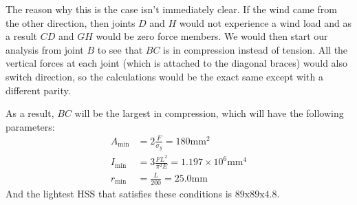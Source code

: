 \documentclass{article}
\begin{document}
The reason why this is the case isn't immediately clear. If the wind came from the other direction, then joints $D$ and $H$ would not experience a wind load and as a result $CD$ and $GH$ would be zero force members. We would then start our analysis from joint $B$ to see that $BC$ is in compression instead of tension. All the vertical forces at each joint (which is attached to the diagonal braces) would also switch direction, so the calculations would be the exact same except with a different parity.

As a result, $BC$ will be the largest in compression, which will have the following parameters:
\begin{align}
    A_\text{min} &= 2\frac{F}{\sigma_y} = 180 \si{\milli\meter\squared}\\ 
    I_\text{min} &= 3\frac{FL^2}{\pi^2 E} = 1.197 \times 10^6 \si{\milli\meter\tothe{4}}\\ 
    r_\text{min} &= \frac{L}{200}  = 25.0\si{\milli\meter}
\end{align}
And the lightest HSS that satisfies these conditions is $\boxed{\text{89x89x4.8}}$.

\newpage
\end{document}
